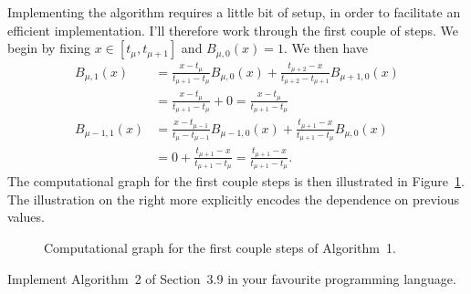\begin{solution}
    Implementing the algorithm requires a little bit of setup, in order to facilitate an efficient implementation.
    I'll therefore work through the first couple of steps.
    We begin by fixing $x \in [t_{\mu}, t_{\mu+1}]$ and $B_{\mu, 0}(x) = 1$.
    We then have
    \begin{align*}
        B_{\mu, 1}(x) &= \frac{x - t_{\mu}}{t_{\mu+1} - t_{\mu}} B_{\mu, 0}(x) + \frac{t_{\mu+2} - x}{t_{\mu+2} - t_{\mu+1}} B_{\mu+1, 0}(x) \\
        &= \frac{x - t_{\mu}}{t_{\mu+1} - t_{\mu}} + 0 = \frac{x - t_{\mu}}{t_{\mu+1} - t_{\mu}} \\
        B_{\mu - 1, 1}(x) &= \frac{x - t_{\mu-1}}{t_{\mu} - t_{\mu-1}} B_{\mu - 1, 0}(x) + \frac{t_{\mu+1} - x}{t_{\mu+1} - t_{\mu}} B_{\mu, 0}(x) \\
        &= 0 + \frac{t_{\mu+1} - x}{t_{\mu+1} - t_{\mu}} = \frac{t_{\mu+1} - x}{t_{\mu+1} - t_{\mu}}.
    \end{align*}
    The computational graph for the first couple steps is then illustrated in Figure~\ref{fig:comp-graph}.
    The illustration on the right more explicitly encodes the dependence on previous values.
    \begin{figure}[ht]
        \centering
        
        \caption{Computational graph for the first couple steps of Algorithm~1.\label{fig:comp-graph}}
    \end{figure}

\end{solution}

\begin{exercise}
    Implement Algorithm~2 of Section~3.9 in your favourite programming language.
\end{exercise}

